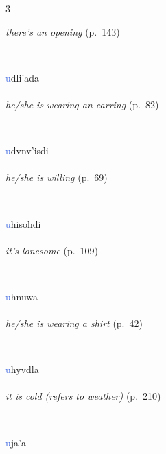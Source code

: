 \documentclass[oneside,openany]{book}%
\begin{document}
\begin{multicols}{3}
\begin{minipage}[t]{\linewidth}
\noindent \textit{there's an opening} (p.~143)
\end{minipage}\\[1em]%
\begin{minipage}[t]{\linewidth}
\raggedright\noindent \textcolor{RoyalBlue}{u}dli'ada\\
\\
\noindent \textit{he/she is wearing an earring} (p.~82)
\end{minipage}\\[1em]%
\begin{minipage}[t]{\linewidth}
\raggedright\noindent \textcolor{RoyalBlue}{u}dvnv'isdi\\
\\
\noindent \textit{he/she is willing} (p.~69)
\end{minipage}\\[1em]%
\begin{minipage}[t]{\linewidth}
\raggedright\noindent \textcolor{RoyalBlue}{u}hisohdi\\
\\
\noindent \textit{it's lonesome} (p.~109)
\end{minipage}\\[1em]%
\begin{minipage}[t]{\linewidth}
\raggedright\noindent \textcolor{RoyalBlue}{u}hnuwa\\
\\
\noindent \textit{he/she is wearing a shirt} (p.~42)
\end{minipage}\\[1em]%
\begin{minipage}[t]{\linewidth}
\raggedright\noindent \textcolor{RoyalBlue}{u}hyvdla\\
\\
\noindent \textit{it is cold (refers to weather)} (p.~210)
\end{minipage}\\[1em]%
\begin{minipage}[t]{\linewidth}
\raggedright\noindent \textcolor{RoyalBlue}{u}ja'a\\
\\

\end{minipage}
\end{multicols}
\end{document}
